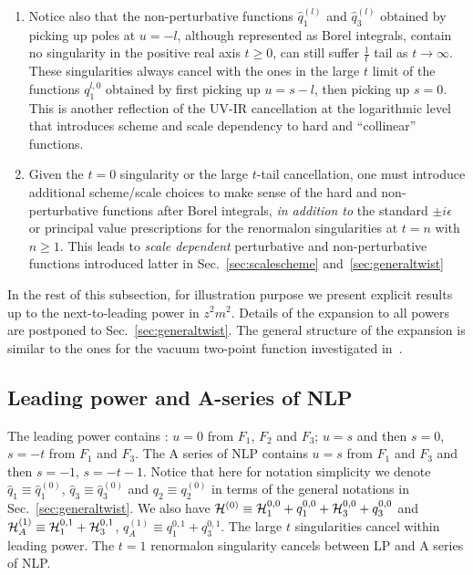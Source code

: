 \documentclass[a4paper,11pt]{article}
\begin{document}
\begin{enumerate}
   At $t=0$, this is the UV divergence cancellation at the logarithmic level. At $t>0$, this is usually called ``renormalon cancellation''. 
   \item Notice also that the non-perturbative functions $\hat q_1^{(l)}$ and $\hat q_3^{(l)}$ obtained by picking up poles at $u=-l$, although represented as Borel integrals, contain no singularity in the positive real axis $t\ge 0$, can still suffer $\frac{1}{t}$ tail as $t\rightarrow \infty$. These singularities always cancel with the ones in the large $t$ limit of the functions ${q}_1^{l,0}$ obtained by first picking up $u=s-l$, then picking up $s=0$. This is another reflection of the UV-IR cancellation at the logarithmic level that introduces scheme and scale dependency to hard and ``collinear'' functions. 
\item Given the $t=0$ singularity or the large $t$-tail cancellation, one must introduce additional scheme/scale choices to make sense of the hard and non-perturbative functions after Borel integrals, {\it in addition to} the standard $\pm i\epsilon$ or principal value prescriptions for the renormalon singularities at $t=n$ with $n\ge 1$. This leads to {\it scale dependent} perturbative and non-perturbative functions introduced latter in Sec.~\ref{sec:scalescheme} and~\ref{sec:generaltwist}
\end{enumerate}
In the rest of this subsection, for illustration purpose we present explicit results up to the next-to-leading power in $z^2m^2$. Details of the expansion to all powers are postponed to Sec.~\ref{sec:generaltwist}. The general structure of the expansion is similar to the ones for the vacuum two-point function investigated in~\cite{Beneke:1998eq}.
\subsection{Leading power and A-series of NLP}
The leading power contains : $u=0$ from $F_1$, $F_2$ and $F_3$; $u=s$ and then $s=0$, $s=-t$ from $F_1$ and $F_3$. The A series of NLP contains $u=s$ from $F_1$ and $F_3$ and then $s=-1$, $s=-t-1$. Notice that here for notation simplicity we denote $\hat q_1\equiv \hat q_1^{(0)}$, $\hat q_3 \equiv \hat q_3^{(0)}$ and $q_2 \equiv q_2^{(0)}$ in terms of the general notations in Sec.~\ref{sec:generaltwist}. We also have ${\cal H}^{(0)}\equiv {\cal H}_1^{0,0}+q_1^{0,0}+{\cal H}_3^{0,0}+q_3^{0,0}$ and ${\cal H}_A^{(1)} \equiv {\cal H}_1^{0,1}+{\cal H}_3^{0,1}$, $q_A^{(1)} \equiv q_1^{0,1}+q_3^{0,1}$. The large $t$ singularities cancel within leading power. The $t=1$ renormalon singularity cancels between LP and A series of NLP. 
\end{document}

